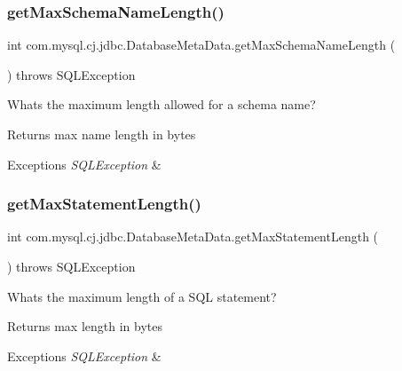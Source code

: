\subsubsection{\texorpdfstring{get\+Max\+Schema\+Name\+Length()}{getMaxSchemaNameLength()}}
{\footnotesize\ttfamily int com.\+mysql.\+cj.\+jdbc.\+Database\+Meta\+Data.\+get\+Max\+Schema\+Name\+Length (\begin{DoxyParamCaption}{ }\end{DoxyParamCaption}) throws S\+Q\+L\+Exception}

What\textquotesingle{}s the maximum length allowed for a schema name?

\begin{DoxyReturn}{Returns}
max name length in bytes 
\end{DoxyReturn}

\begin{DoxyExceptions}{Exceptions}
{\em S\+Q\+L\+Exception} & \\
\hline
\end{DoxyExceptions}
\mbox{\label{classcom_1_1mysql_1_1cj_1_1jdbc_1_1_database_meta_data_adf0c116c8183dde21674d747b8315ba6}} 
\subsubsection{\texorpdfstring{get\+Max\+Statement\+Length()}{getMaxStatementLength()}}
{\footnotesize\ttfamily int com.\+mysql.\+cj.\+jdbc.\+Database\+Meta\+Data.\+get\+Max\+Statement\+Length (\begin{DoxyParamCaption}{ }\end{DoxyParamCaption}) throws S\+Q\+L\+Exception}

What\textquotesingle{}s the maximum length of a S\+QL statement?

\begin{DoxyReturn}{Returns}
max length in bytes 
\end{DoxyReturn}

\begin{DoxyExceptions}{Exceptions}
{\em S\+Q\+L\+Exception} & \\
\hline
\end{DoxyExceptions}
\mbox{\label{classcom_1_1mysql_1_1cj_1_1jdbc_1_1_database_meta_data_a576f3289bac06848f324aec66c02da4e}} 
